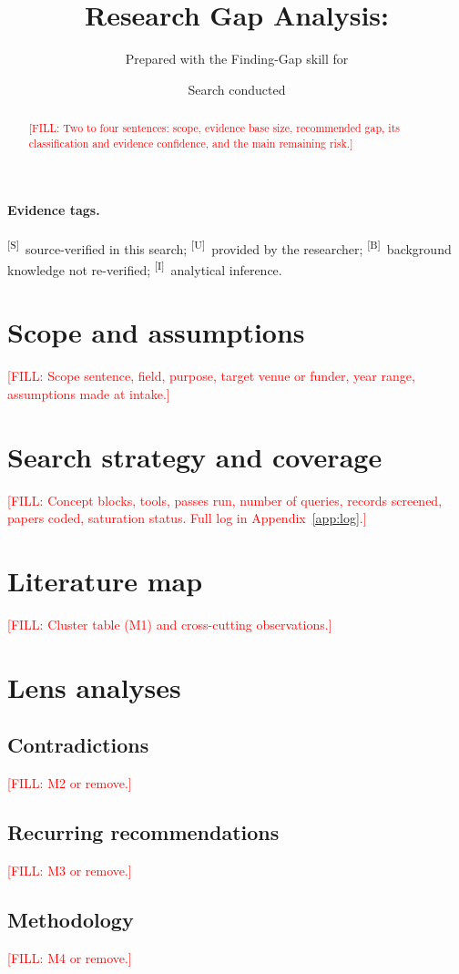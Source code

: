 \documentclass[11pt]{article}
\title{Research Gap Analysis:\\ \fillin{topic}}
\author{Prepared with the Finding-Gap skill for \fillin{researcher}}
\date{Search conducted \fillin{dates}}
\newcommand{\fillin}[1]{\textcolor{red}{[FILL: #1]}}
\newcommand{\tagS}{\textsuperscript{\textsf{[S]}}}  %
\newcommand{\tagU}{\textsuperscript{\textsf{[U]}}}  %
\newcommand{\tagB}{\textsuperscript{\textsf{[B]}}}  %
\newcommand{\tagI}{\textsuperscript{\textsf{[I]}}}  %
\begin{document}
\maketitle

\begin{abstract}
\fillin{Two to four sentences: scope, evidence base size, recommended gap, its classification and evidence confidence, and the main remaining risk.}
\end{abstract}

\paragraph{Evidence tags.} \tagS~source-verified in this search; \tagU~provided by the researcher; \tagB~background knowledge not re-verified; \tagI~analytical inference.

\section{Scope and assumptions}
\fillin{Scope sentence, field, purpose, target venue or funder, year range, assumptions made at intake.}

\section{Search strategy and coverage}
\fillin{Concept blocks, tools, passes run, number of queries, records screened, papers coded, saturation status. Full log in Appendix~\ref{app:log}.}

\section{Literature map}
\fillin{Cluster table (M1) and cross-cutting observations.}

\section{Lens analyses}
\subsection{Contradictions}\fillin{M2 or remove.}
\subsection{Recurring recommendations}\fillin{M3 or remove.}
\subsection{Methodology}\fillin{M4 or remove.}
\end{document}
